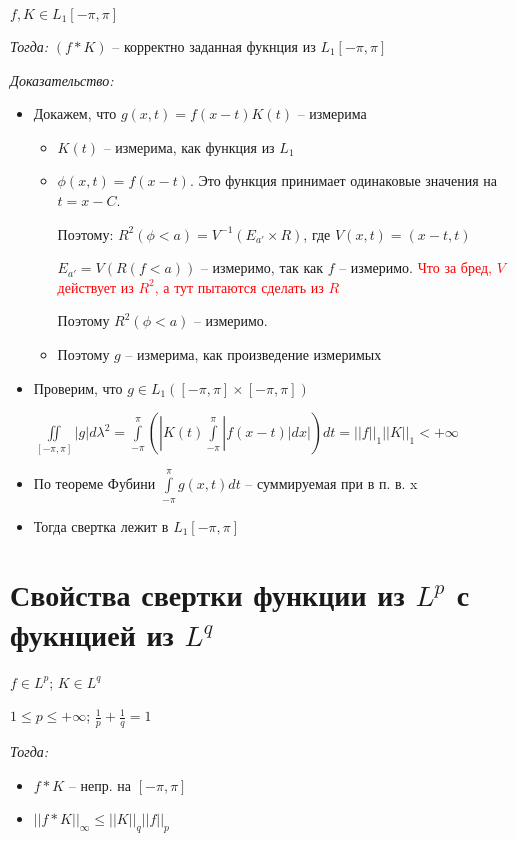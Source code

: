 \documentclass[paper=a4, fontsize=17pt]{article}
\begin{document}
$ f, K \in L_1[-\pi, \pi] $

\emph{Тогда:} $ (f * K)$ -- корректно заданная фукнция из $ L_1[-\pi, \pi] $

\emph{Доказательство:}

\begin{itemize}
	\item Докажем, что $ g(x, t) = f(x - t)K(t) $ -- измерима
		\begin{itemize}
			\item $ K(t) $ -- измерима, как функция из $ L_1 $
			\item $ \phi(x, t) = f(x - t) $. Это функция принимает одинаковые значения на $ t = x - C $.

			Поэтому: $ R^2(\phi < a) = V^{-1}(E_{a'} \times R)$, где $ V(x, t) = (x - t, t) $

			$ E_{a'} = V(R(f < a)) $ -- измеримо, так как $ f $ -- измеримо.
			\textcolor{red}{Что за бред, $V$ действует из $R^2$, а тут пытаются сделать из $R$}

			Поэтому $ R^2(\phi < a) $ -- измеримо.
			\item Поэтому $ g $ -- измерима, как произведение измеримых
		\end{itemize}

	\item Проверим, что $ g \in L_1([-\pi, \pi]\times[-\pi, \pi]) $

		$ \iint\limits_{[-\pi, \pi]} | g | d\lambda^2 =
		  \int\limits_{-\pi}^{\pi} (|K(t)  \int\limits_{-\pi}^{\pi} | f(x-t)| dx |) dt =
		  ||f||_1 ||K||_1 < +\infty $
	\item По теореме Фубини $ \int\limits_{-\pi}^{\pi} g(x, t) dt $ -- суммируемая при в п. в. x

	\item Тогда свертка лежит в $ L_1[-\pi, \pi] $


\end{itemize}

\section{Свойства свертки функции из $ L^p $ с фукнцией из $ L^q $}

$ f \in L^p $; $ K \in L^q $

$ 1 \leqslant p \leqslant +\infty $; $ \frac{1}{p} + \frac{1}{q} = 1 $

\emph{Тогда:}
\begin{itemize}
	\item $ f \ast K $ -- непр. на $ [-\pi, \pi] $
	\item $ ||f \ast K||_{\infty} \leqslant ||K||_q ||f||_p $
\end{itemize}
\end{document}
